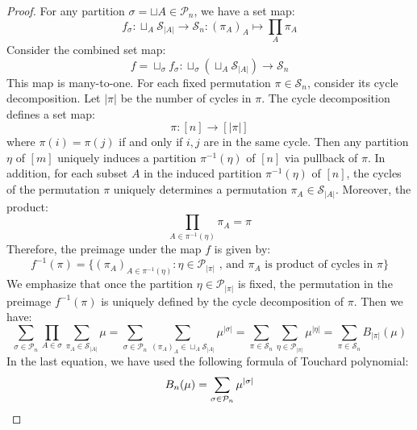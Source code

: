 \documentclass[a4paper,11pt]{article}
\theoremstyle{definition}
\numberwithin{equation}{section}
\begin{document}
\begin{proof}
    For any partition $\sigma =\sqcup A\in\mathcal{P}_n$, we have a set map:
    \begin{equation}
        f_\sigma:\sqcup_A\mathcal{S}_{|A|}\rightarrow \mathcal{S}_n: (\pi_A)_A\mapsto \prod_A\pi_A
    \end{equation}
    Consider the combined set map:
    \begin{equation}
        f = \sqcup_\sigma f_\sigma: \sqcup_\sigma(\sqcup_A\mathcal{S}_{|A|})\rightarrow \mathcal{S}_n
    \end{equation}
    This map is many-to-one. For each fixed permutation $\pi \in\mathcal{S}_n$, consider its cycle decomposition. Let $|\pi|$ be the number of cycles in $\pi$. The cycle decomposition defines a set map:
    \begin{equation}
        \pi:[n]\rightarrow[|\pi|]
    \end{equation}
    where $\pi(i) = \pi(j)$ if and only if $i,j$ are in the same cycle. Then any partition $\eta$ of $[m]$ uniquely induces a partition $\pi^{-1}(\eta)$ of $[n]$ via pullback of $\pi$. In addition, for each subset $A$ in the induced partition $\pi^{-1}(\eta)$ of $[n]$, the cycles of the permutation $\pi$ uniquely determines a permutation $\pi_A\in\mathcal{S}_{|A|}$. Moreover, the product:
    \begin{equation}
        \prod_{A\in \pi^{-1}(\eta)}\pi_A = \pi
    \end{equation}
    Therefore, the preimage under the map $f$ is given by:
    \begin{equation}
        f^{-1}(\pi) = \{(\pi_A)_{A\in \pi^{-1}(\eta)}:\eta\in\mathcal{P}_{|\pi|}\text{ , and }\pi_A\text{ is product of cycles in }\pi\}
    \end{equation}
    We emphasize that once the partition $\eta\in\mathcal{P}_{|\pi|}$ is fixed, the permutation in the preimage $f^{-1}(\pi)$ is uniquely defined by the cycle decomposition of $\pi$.
    Then we have:
    \begin{equation}\label{equation:resummation}
        \sum_{\sigma\in\mathcal{P}_n}\prod_{A\in\sigma}\sum_{\pi_A\in\mathcal{S}_{|A|}}\mu = \sum_{\sigma\in\mathcal{P}_n}\sum_{(\pi_A)_A\in\sqcup_A\mathcal{S}_{|A|}}\mu^{|\sigma|} = \sum_{\pi\in\mathcal{S}_n}\sum_{\eta\in \mathcal{P}_{|\pi|}}\mu^{|\eta|} = \sum_{\pi\in\mathcal{S}_n}B_{|\pi|}(\mu)
    \end{equation}
    In the last equation, we have used the following formula of Touchard polynomial:
    \begin{equation}
        B_n(\mu) = \sum_{\sigma\in\mathcal{P}_n}\mu^{|\sigma|}\qedhere
    \end{equation}
\end{proof}
\end{document}

